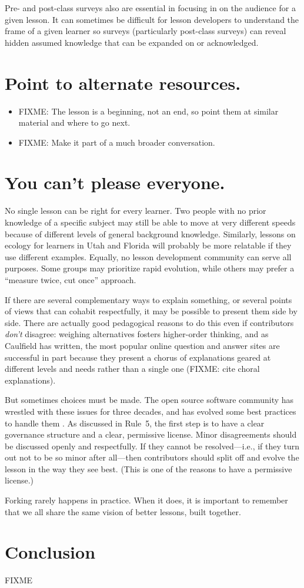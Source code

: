 \documentclass[10pt,letterpaper]{article}
\newcommand{\rulemajor}[1]{\section{#1}}
\begin{document}
Pre- and post-class surveys also are essential in focusing in on the audience for a given lesson.
It can sometimes be difficult for lesson developers to understand the frame of a given learner
so surveys (particularly post-class surveys) can reveal hidden assumed knowledge
that can be expanded on or acknowledged.

\rulemajor{Point to alternate resources.}

\begin{itemize}

\item
  FIXME: The lesson is a beginning, not an end, so point them at similar material and where to go next.

\item
  FIXME: Make it part of a much broader conversation.

\end{itemize}

\rulemajor{You can't please everyone.}

No single lesson can be right for every learner.
Two people with no prior knowledge of a specific subject
may still be able to move at very different speeds
because of different levels of general background knowledge.
Similarly,
lessons on ecology for learners in Utah and Florida
will probably be more relatable if they use different examples.
Equally,
no lesson development community can serve all purposes.
Some groups may prioritize rapid evolution,
while others may prefer a ``measure twice, cut once'' approach.

If there are several complementary ways to explain something,
or several points of views that can cohabit respectfully,
it may be possible to present them side by side.
There are actually good pedagogical reasons to do this even if contributors \emph{don't} disagree:
weighing alternatives fosters higher-order thinking,
and as Caulfield has written,
the most popular online question and answer sites
are successful in part because they present a chorus of explanations
geared at different levels and needs
rather than a single one (FIXME: cite choral explanations).

But sometimes choices must be made.
The open source software community has wrestled with these issues for three decades,
and has evolved some best practices to handle them
\cite{producing-oss}.
As discussed in Rule~5,
the first step is to have a clear governance structure and a clear, permissive license.
Minor disagreements should be discussed openly and respectfully.
If they cannot be resolved---i.e., if they turn out not to be so minor after all---then
contributors should split off and evolve the lesson in the way they see best.
(This is one of the reasons to have a permissive license.)

Forking rarely happens in practice.
When it does,
it is important to remember that we all share the same vision of better lessons, built together.

\section*{Conclusion}

FIXME


\end{document}
